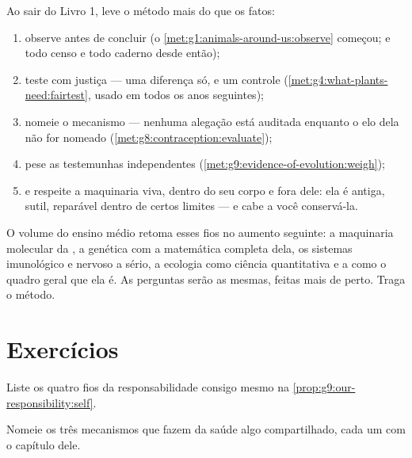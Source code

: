 \begin{method}\label{met:g9:our-responsibility:method}
Ao sair do Livro 1, leve o método mais do que os fatos:
\begin{enumerate}
  \item observe antes de concluir (o
        \cref{met:g1:animals-around-us:observe} começou; e
        todo censo e todo caderno desde então);
  \item teste com justiça --- uma diferença só, e um controle
        (\cref{met:g4:what-plants-need:fairtest}, usado em
        todos os anos seguintes);
  \item nomeie o mecanismo --- nenhuma alegação está auditada
        enquanto o elo dela não for nomeado
        (\cref{met:g8:contraception:evaluate});
  \item pese as testemunhas independentes
        (\cref{met:g9:evidence-of-evolution:weigh});
  \item e respeite a maquinaria viva, dentro do seu corpo e
        fora dele: ela é antiga, sutil, reparável dentro de
        certos limites --- e cabe a você conservá-la.
\end{enumerate}
\end{method}

\begin{remark}\label{rem:g9:our-responsibility:next}
O volume do ensino médio retoma esses fios no aumento
seguinte: a maquinaria molecular da , a genética com a
matemática completa dela, os sistemas imunológico e nervoso a
sério, a ecologia como ciência quantitativa e a  como
o quadro geral que ela é. As perguntas serão as mesmas,
feitas mais de perto. Traga o método.
\end{remark}

\section{Exercícios}

\begin{exercise}[$\star$]\label{exo:g9:our-responsibility:1}
Liste os quatro fios da responsabilidade consigo mesmo na
\cref{prop:g9:our-responsibility:self}.
\end{exercise}

\begin{exercise}[$\star$]\label{exo:g9:our-responsibility:2}
Nomeie os três mecanismos que fazem da saúde algo
compartilhado, cada um com o capítulo dele.
\end{exercise}

